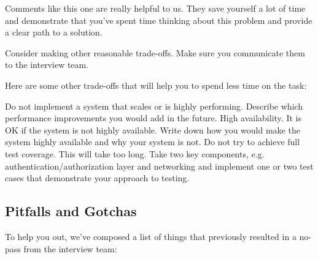 \documentclass{article}
\begin{document}
Comments like this one are really helpful to us.
They save yourself a lot of time and demonstrate that you've spent time thinking about this problem and provide a clear path to a solution.

Consider making other reasonable trade-offs. Make sure you communicate them to the interview team.

Here are some other trade-offs that will help you to spend less time on the task:


Do not implement a system that scales or is highly performing. Describe which performance improvements you would add in the future.
High availability. It is OK if the system is not highly available. Write down how you would make the system highly available and why your system is not.
Do not try to achieve full test coverage. This will take too long. Take two key components, e.g. authentication/authorization layer and networking and implement one or two test cases that demonstrate your approach to testing.


\subsection{Pitfalls and Gotchas}
    
  To help you out, we've composed a list of things that previously resulted in a no-pass from the interview team:
\end{document}
